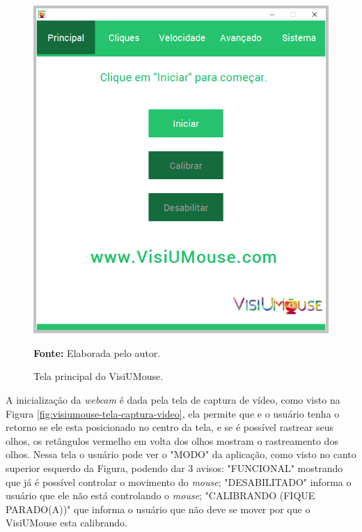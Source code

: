 \begin{figure}[htbp]
\caption{Tela principal do VisiUMouse.} 
\centering \includegraphics[scale=.5]{img/visiumouse-tela-principal-v216.png}

\textbf{Fonte:} Elaborada pelo autor.
\label{fig:visiumouse-tela-principal}
\end{figure}

A inicialização da \textit{webcam} é dada pela tela de captura de vídeo, como visto na Figura \ref{fig:visiumouse-tela-captura-video}, ela permite que e o usuário tenha o retorno se ele esta posicionado no centro da tela, e se é possível rastrear seus olhos, os retângulos vermelho em volta dos olhos mostram o rastreamento dos olhos. Nessa tela o usuário pode ver o "MODO" da aplicação, como visto no canto superior esquerdo da Figura, podendo dar 3 avisos: "FUNCIONAL" mostrando que já é possível controlar o movimento do \textit{mouse}; "DESABILITADO" informa o usuário que ele não está controlando o \textit{mouse}; "CALIBRANDO (FIQUE PARADO(A))" que informa o usuário que não deve se mover por que o VisiUMouse esta calibrando.

